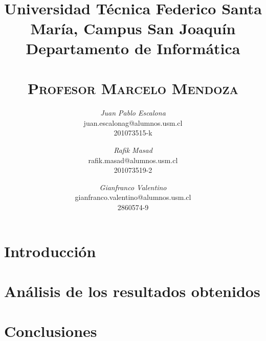 \documentclass{article}
\title{
  \Large\textmd{\textbf{\tareaRamo\\ \tareaTitulo}}\\
  \vspace{0.1in}
  \normalsize
  Universidad Técnica Federico Santa María, Campus San Joaquín\\
  Departamento de Informática\\
  \vspace{0.1in}
  \small{\textsc{\tareaFecha}}\\
  \vspace{0.1in}
  \large{\textsc{Profesor Marcelo Mendoza}}
  \vspace{1.5in}
}
\author{
    \textit{Juan Pablo Escalona} \\
    \small{juan.escalonag@alumnos.usm.cl} \\
    \small{201073515-k}
    \and
    \textit{Rafik Masad} \\
    \small{rafik.masad@alumnos.usm.cl} \\
    \small{201073519-2}
    \and
    \textit{Gianfranco Valentino}\\
    \small{gianfranco.valentino@alumnos.usm.cl}\\
    \small{2860574-9}
}
\date{}
\newcommand{\python}[2]{
  \begin{itemize}
    \item[]
  \end{itemize}
}
\begin{document}
\maketitle
\newpage


\section*{Introducción}
\lipsum

\section*{Análisis de los resultados obtenidos}

\lipsum


\section*{Conclusiones}

\lipsum




\end{document}
